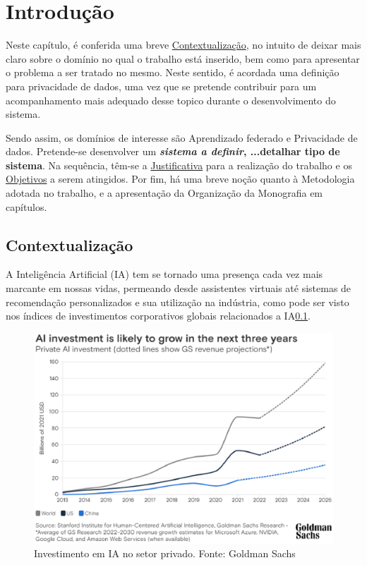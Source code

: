 \chapter*[Introdução]{Introdução}

Neste capítulo, é conferida uma breve \hyperref[sec:contextualizacao]{Contextualização}, no intuito de deixar mais claro sobre o domínio no qual o trabalho está inserido, bem como para apresentar o problema a ser tratado no mesmo. Neste sentido, é acordada uma definição para privacidade de dados, uma vez que se pretende contribuir para um acompanhamento mais adequado desse topico durante o desenvolvimento do sistema. 

Sendo assim, os domínios de interesse são Aprendizado federado e Privacidade de dados. Pretende-se desenvolver um \textbf{\emph{sistema a definir}, ...detalhar tipo de sistema}. Na sequência, têm-se a \hyperref[sec:justificativa]{Justificativa} para a realização do trabalho e os \hyperref[sec:objetivos]{Objetivos} a serem atingidos. Por fim, há uma breve noção quanto à Metodologia adotada no trabalho, e a apresentação da Organização da Monografia em capítulos.

\section{Contextualização}
\label{sec:contextualizacao}

A Inteligência Artificial (IA) tem se tornado uma presença cada vez mais marcante em nossas vidas, permeando desde assistentes virtuais até sistemas de recomendação personalizados e sua utilização na indústria, como pode ser visto nos índices de investimentos corporativos globais relacionados a IA\ref{fig:investimentoIA}.

\begin{figure}[h]
    \centering
    \includegraphics[scale=0.6]{figuras/AIInvestiments2025.eps}
    \caption{Investimento em IA no setor privado. Fonte: Goldman Sachs \cite{goldmansachs2023}}
    \label{fig:investimentoIA}
\end{figure}

